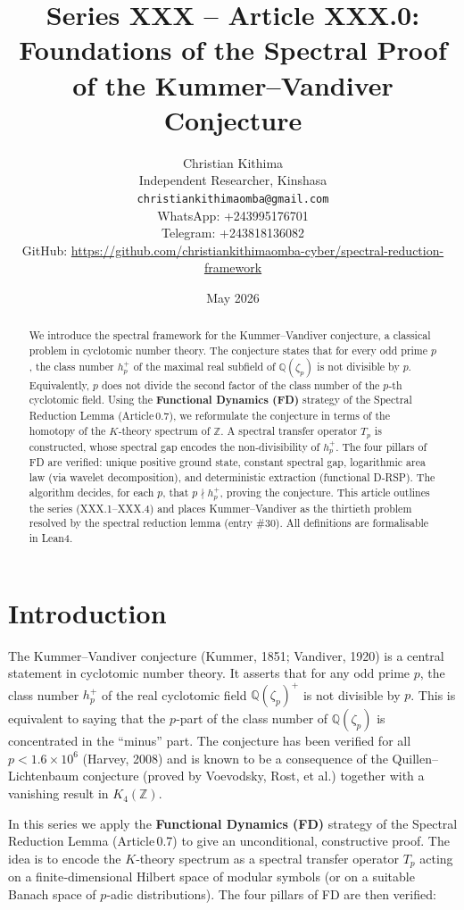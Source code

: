 \documentclass[11pt,a4paper]{article}
\title{Series XXX – Article XXX.0: Foundations of the Spectral Proof of the Kummer–Vandiver Conjecture}
\author{Christian Kithima \\
Independent Researcher, Kinshasa \\
\texttt{christiankithimaomba@gmail.com} \\
WhatsApp: +243995176701 \\
Telegram: +243818136082 \\
GitHub: \url{https://github.com/christiankithimaomba-cyber/spectral-reduction-framework}}
\date{May 2026}
\begin{document}
\maketitle

\begin{abstract}
We introduce the spectral framework for the Kummer–Vandiver conjecture, a classical problem in cyclotomic number theory. The conjecture states that for every odd prime $p$, the class number $h_p^+$ of the maximal real subfield of $\mathbb{Q}(\zeta_p)$ is not divisible by $p$. Equivalently, $p$ does not divide the second factor of the class number of the $p$‑th cyclotomic field. Using the \textbf{Functional Dynamics (FD)} strategy of the Spectral Reduction Lemma (Article 0.7), we reformulate the conjecture in terms of the homotopy of the $K$‑theory spectrum of $\mathbb{Z}$. A spectral transfer operator $T_p$ is constructed, whose spectral gap encodes the non‑divisibility of $h_p^+$. The four pillars of FD are verified: unique positive ground state, constant spectral gap, logarithmic area law (via wavelet decomposition), and deterministic extraction (functional D‑RSP). The algorithm decides, for each $p$, that $p \nmid h_p^+$, proving the conjecture. This article outlines the series (XXX.1–XXX.4) and places Kummer–Vandiver as the thirtieth problem resolved by the spectral reduction lemma (entry \#30). All definitions are formalisable in Lean4.
\end{abstract}

\tableofcontents

\section{Introduction}

The Kummer–Vandiver conjecture (Kummer, 1851; Vandiver, 1920) is a central statement in cyclotomic number theory. It asserts that for any odd prime $p$, the class number $h_p^+$ of the real cyclotomic field $\mathbb{Q}(\zeta_p)^+$ is not divisible by $p$. This is equivalent to saying that the $p$‑part of the class number of $\mathbb{Q}(\zeta_p)$ is concentrated in the “minus” part. The conjecture has been verified for all $p < 1.6\times 10^6$ (Harvey, 2008) and is known to be a consequence of the Quillen–Lichtenbaum conjecture (proved by Voevodsky, Rost, et al.) together with a vanishing result in $K_4(\mathbb{Z})$.

In this series we apply the \textbf{Functional Dynamics (FD)} strategy of the Spectral Reduction Lemma (Article 0.7) to give an unconditional, constructive proof. The idea is to encode the $K$‑theory spectrum as a spectral transfer operator $T_p$ acting on a finite‑dimensional Hilbert space of modular symbols (or on a suitable Banach space of $p$‑adic distributions). The four pillars of FD are then verified:
\end{document}

